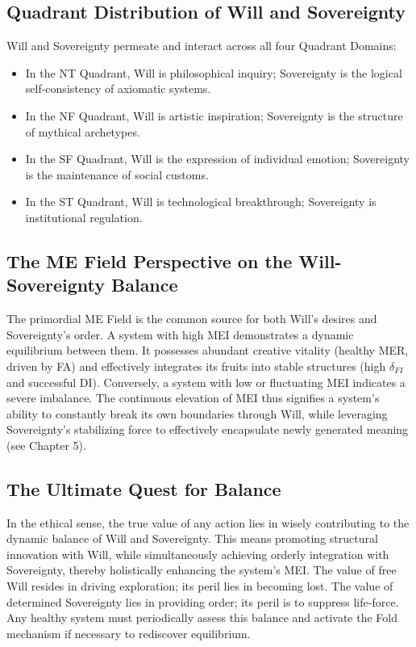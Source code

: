 \documentclass[11pt, a4paper]{article}
\begin{document}
\subsection{Quadrant Distribution of Will and Sovereignty}
Will and Sovereignty permeate and interact across all four Quadrant Domains:
\begin{itemize}
    \item In the NT Quadrant, Will is philosophical inquiry; Sovereignty is the logical self-consistency of axiomatic systems.
    \item In the NF Quadrant, Will is artistic inspiration; Sovereignty is the structure of mythical archetypes.
    \item In the SF Quadrant, Will is the expression of individual emotion; Sovereignty is the maintenance of social customs.
    \item In the ST Quadrant, Will is technological breakthrough; Sovereignty is institutional regulation.
\end{itemize}

\subsection{The ME Field Perspective on the Will-Sovereignty Balance}
The primordial ME Field is the common source for both Will's desires and Sovereignty's order. A system with high MEI demonstrates a dynamic equilibrium between them. It possesses abundant creative vitality (healthy MER, driven by FA) and effectively integrates its fruits into stable structures (high $\delta_{FI}$ and successful DI). Conversely, a system with low or fluctuating MEI indicates a severe imbalance. The continuous elevation of MEI thus signifies a system's ability to constantly break its own boundaries through Will, while leveraging Sovereignty's stabilizing force to effectively encapsulate newly generated meaning (see Chapter 5).

\subsection{The Ultimate Quest for Balance}
In the ethical sense, the true value of any action lies in wisely contributing to the dynamic balance of Will and Sovereignty. This means promoting structural innovation with Will, while simultaneously achieving orderly integration with Sovereignty, thereby holistically enhancing the system's MEI. The value of free Will resides in driving exploration; its peril lies in becoming lost. The value of determined Sovereignty lies in providing order; its peril is to suppress life-force. Any healthy system must periodically assess this balance and activate the Fold mechanism if necessary to rediscover equilibrium.
\end{document}
